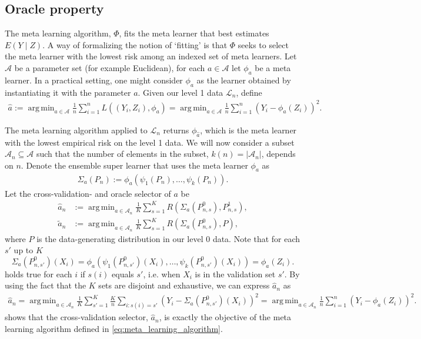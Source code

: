 \documentclass[11pt, a4paper]{article}
\theoremstyle{definition}
\theoremstyle{remark}
\DeclareMathOperator*{\argmin}{arg\,min}
\newcommand{\ml}{k}
\newcommand{\la}{\psi}
\newcommand{\lone}{\mathcal{L}}
\newcommand{\meta}{\phi}
\newcommand{\Meta}{\Phi}
\newcommand{\esl}{\Sigma}
\begin{document}
\subsection{Oracle property}
The meta learning algorithm, $ \Meta $, fits the meta learner that best estimates $ E(Y \mid Z) $. A way of formalizing the notion of `fitting' is that $ \Meta $ seeks to select the meta learner with the lowest risk among an indexed set of meta learners. Let $ \mathcal{A} $ be a parameter set (for example Euclidean), for each $ a \in \mathcal{A} $ let $ \meta_{a} $ be a meta learner. In a practical setting, one might consider $ \meta_{a} $ as the learner obtained by instantiating it with the parameter $ a $. Given our level 1 data $ \lone_{n} $, define 
\begin{align} \label{eq:meta_learning_algorithm}
    \hat{a} := \argmin_{a \in \mathcal{A}} \frac{1}{n} \sum_{i = 1}^{n} L((Y_i, Z_i), \meta_{a}) = \argmin_{a \in \mathcal{A}} \frac{1}{n} \sum_{i = 1}^{n} (Y_i - \meta_{a}(Z_i))^2.
\end{align}

The meta learning algorithm applied to $ \lone_{n} $ returns $ \meta_{ \hat{a} } $, which is the meta learner with the lowest empirical risk on the level 1 data. We will now consider a subset $ \mathcal{A}_n \subseteq \mathcal{A} $ such that the number of elements in the subset, $ \ml(n) = |\mathcal{A}_{n}| $, depends on $ n $. Denote the ensemble super learner that uses the meta learner $ \meta_{ a } $ as 
\begin{align*}
    \esl_{a}(P_{n}) := \meta_{a}(\la_1(P_{n}), \ldots, \la_k(P_{n})).
\end{align*}
Let the cross-validation- and oracle selector of $ a $ be 
\begin{align*}
    \hat{a}_n &:= \argmin_{a \in \mathcal{A}_{n}} \frac{1}{K} \sum_{s = 1}^{K} R(\esl_{a}(P_{n, s}^{0}), P_{n, s}^{1}), \\
    \tilde{a}_n &:= \argmin_{a \in \mathcal{A}_n} \frac{1}{K} \sum_{s = 1}^{K} R(\esl_{a}(P_{n, s}^{0}) , P),
\end{align*}
where $ P $ is the data-generating distribution in our level 0 data. Note that for each $ s' $ up to $ K $ 
$$ \esl_a(P_{n, s'}^{0})(X_i) = \meta_{a}(\la_{1}(P_{n, s'}^{0})(X_i) , \dots , \la_{\ml}(P_{n, s'}^{0})(X_i) ) = \meta_{a}(Z_i). $$ 
holds true for each $ i $ if $ s(i)$ equals $ s' $, i.e. when $ X_i $ is in the validation set $ s' $. By using the fact that the $ K $ sets are disjoint and exhaustive, we can express $ \hat{a}_n $ as  
\begin{align} \label{eq:meta_learning_algorithm_cv}
    \hat{a}_n = \argmin_{a \in \mathcal{A}_n} \frac{1}{K} \sum_{s' = 1}^{K} \frac{K}{n} \sum_{i: s(i) = s'} (Y_i - \esl_{a}(P_{n,s'}^{0}) (X_i))^2 = \argmin_{a \in \mathcal{A}_n} \frac{1}{n} \sum_{i = 1}^{n} (Y_i - \meta_{a}(Z_i))^2.
\end{align}
 shows that the cross-validation selector, $ \hat{a}_n $, is exactly the objective of the meta learning algorithm defined in \eqref{eq:meta_learning_algorithm}. 
\end{document}
